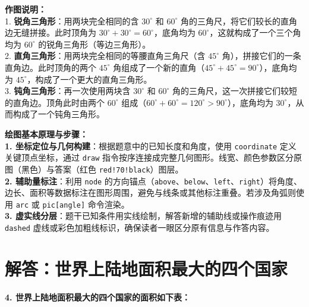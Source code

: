 \documentclass[12pt, a4paper]{ctexrep}
\begin{document}
\vspace{0.6cm}
{\small\color{gray}
\textbf{作图说明：}\\
1. \textbf{锐角三角形}：用两块完全相同的含 $30^\circ$ 和 $60^\circ$ 角的三角尺，将它们较长的直角边无缝拼接。此时顶角为 $30^\circ + 30^\circ = 60^\circ$，底角均为 $60^\circ$，这就构成了一个三个角均为 $60^\circ$ 的锐角三角形（等边三角形）。\\
2. \textbf{直角三角形}：用两块完全相同的等腰直角三角尺（含 $45^\circ$ 角），拼接它们的一条直角边。此时顶角的两个 $45^\circ$ 角组成了一个新的直角（$45^\circ + 45^\circ = 90^\circ$），底角均为 $45^\circ$，构成了一个更大的直角三角形。\\
3. \textbf{钝角三角形}：再一次使用两块含 $30^\circ$ 和 $60^\circ$ 角的三角尺，这一次拼接它们较短的直角边。顶角此时由两个 $60^\circ$ 组成（$60^\circ + 60^\circ = 120^\circ>90^\circ$），底角均为 $30^\circ$，从而构成了一个钝角三角形。
}

\vspace{0.8cm}


\vspace{0.6cm}

{\small\color{blue!70!black}
\textbf{绘图基本原理与步骤：}\\
\textbf{1. 坐标定位与几何构建}：根据题意中的已知长度和角度，使用 \texttt{coordinate} 定义关键顶点坐标，通过 \texttt{draw} 指令按序连接成完整几何图形。线宽、颜色参数区分原图（黑色）与答案（红色 \texttt{red!70!black}）图层。\\
\textbf{2. 辅助量标注}：利用 \texttt{node} 的方向锚点（\texttt{above}、\texttt{below}、\texttt{left}、\texttt{right}）将角度、边长、面积等数据标注在图形周围，避免与线条或其他标注重叠。若涉及角弧则使用 \texttt{arc} 或 \texttt{pic[angle]} 命令渲染。\\
\textbf{3. 虚实线分层}：题干已知条件用实线绘制，解答新增的辅助线或操作痕迹用 \texttt{dashed} 虚线或彩色加粗线标识，确保读者一眼区分原有信息与作答内容。
}

\newpage

\section{解答：世界上陆地面积最大的四个国家}

\vspace{0.4cm}

\noindent\textbf{4. 世界上陆地面积最大的四个国家的面积如下表：}
\end{document}
